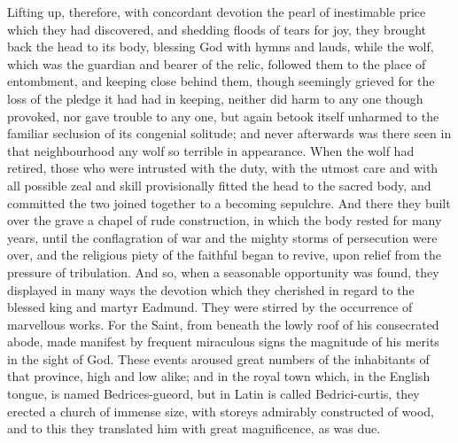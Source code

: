 \documentclass[10pt]{book}
\begin{document}
\begin{paracol}{2}
Lifting up, therefore, with concordant devotion the pearl of inestimable price which they had discovered, and shedding floods of tears for joy, they brought back the head to its body, blessing God with hymns and lauds, while the wolf, which was the guardian and bearer of the relic, followed them to the place of entombment, and keeping close behind them, though seemingly grieved for the loss of the pledge it had had in keeping, neither did harm to any one though provoked, nor gave trouble to any one, but again betook itself unharmed to the familiar seclusion of its congenial solitude; and never afterwards was there seen in that neighbourhood any wolf so terrible in appearance. When the wolf had retired, those who were intrusted with the duty, with the utmost care and with all possible zeal and skill provisionally fitted the head to the sacred body, and committed the two joined together to a becoming sepulchre. And there they built over the grave a chapel of rude construction, in which the body rested for many years, until the conflagration of war and the mighty storms of persecution were over, and the religious piety of the faithful began to revive, upon relief from the pressure of tribulation. And so, when a seasonable opportunity was found, they displayed in many ways the devotion which they cherished in regard to the blessed king and martyr Eadmund. They were stirred by the occurrence of marvellous works. For the Saint, from beneath the lowly roof of his consecrated abode, made manifest by frequent miraculous signs the magnitude of his merits in the sight of God. These events aroused great numbers of the inhabitants of that province, high and low alike; and in the royal town which, in the English tongue, is named Bedrices-gueord, but in Latin is called Bedrici-curtis, they erected a church of immense size, with storeys admirably constructed of wood, and to this they translated him with great magnificence, as was due.

\switchcolumn*


\end{paracol}
\end{document}
